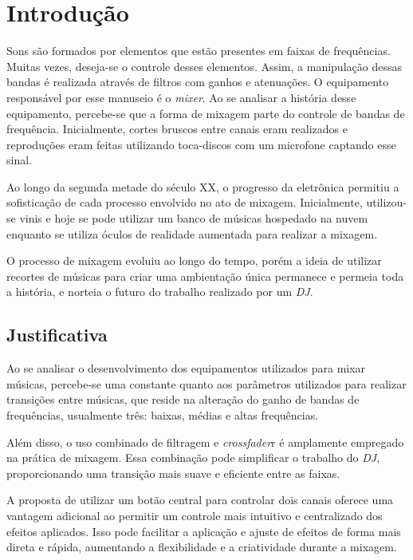 \chapter[Introdução]{Introdução}

Sons são formados por elementos que estão presentes em faixas de frequências. Muitas vezes, deseja-se o controle desses elementos. Assim, a manipulação dessas bandas é realizada através de filtros com ganhos e atenuações. O equipamento responsável por esse manuseio é o \textit{mixer}.
Ao se analisar a história desse equipamento, percebe-se que a forma de mixagem parte do controle de bandas de frequência. Inicialmente, cortes bruscos entre canais eram realizados e reproduções eram feitas utilizando toca-discos com um microfone captando esse sinal.

Ao longo da segunda metade do século XX, o progresso da eletrônica permitiu a sofisticação de cada processo envolvido no ato de mixagem. Inicialmente, utilizou-se vinis e hoje se pode utilizar um banco de músicas hospedado na nuvem enquanto se utiliza óculos de realidade aumentada para realizar a mixagem.

O processo de mixagem evoluiu ao longo do tempo, porém a ideia de utilizar recortes de músicas para criar uma ambientação única permanece e permeia toda a história, e norteia o futuro do trabalho realizado por um \textit{DJ}.

\section{Justificativa}

Ao se analisar o desenvolvimento dos equipamentos utilizados para mixar músicas, percebe-se uma constante quanto aos parâmetros utilizados para realizar transições entre músicas, que reside na alteração do ganho de bandas de frequências, usualmente três: baixas, médias e altas frequências.

Além disso, o uso combinado de filtragem e \textit{crossfader}r é amplamente empregado na prática de mixagem. Essa combinação pode simplificar o trabalho do \textit{DJ}, proporcionando uma transição mais suave e eficiente entre as faixas. 

A proposta de utilizar um botão central para controlar dois canais oferece uma vantagem adicional ao permitir um controle mais intuitivo e centralizado dos efeitos aplicados. Isso pode facilitar a aplicação e ajuste de efeitos de forma mais direta e rápida, aumentando a flexibilidade e a criatividade durante a mixagem.

